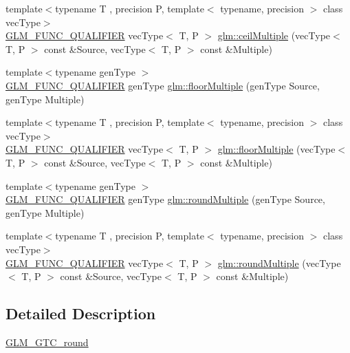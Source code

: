 \begin{DoxyCompactItemize}
\item 
{\footnotesize template$<$typename T , precision P, template$<$ typename, precision $>$ class vec\+Type$>$ }\\\mbox{\hyperlink{setup_8hpp_a33fdea6f91c5f834105f7415e2a64407}{G\+L\+M\+\_\+\+F\+U\+N\+C\+\_\+\+Q\+U\+A\+L\+I\+F\+I\+ER}} vec\+Type$<$ T, P $>$ \mbox{\hyperlink{group__gtc__round_gafe632af669ac57d670ca18e3665a12ca}{glm\+::ceil\+Multiple}} (vec\+Type$<$ T, P $>$ const \&Source, vec\+Type$<$ T, P $>$ const \&Multiple)
\item 
{\footnotesize template$<$typename gen\+Type $>$ }\\\mbox{\hyperlink{setup_8hpp_a33fdea6f91c5f834105f7415e2a64407}{G\+L\+M\+\_\+\+F\+U\+N\+C\+\_\+\+Q\+U\+A\+L\+I\+F\+I\+ER}} gen\+Type \mbox{\hyperlink{group__gtc__round_ga9eafb9dbedf84e5cece65c2fe9d5631d}{glm\+::floor\+Multiple}} (gen\+Type Source, gen\+Type Multiple)
\item 
{\footnotesize template$<$typename T , precision P, template$<$ typename, precision $>$ class vec\+Type$>$ }\\\mbox{\hyperlink{setup_8hpp_a33fdea6f91c5f834105f7415e2a64407}{G\+L\+M\+\_\+\+F\+U\+N\+C\+\_\+\+Q\+U\+A\+L\+I\+F\+I\+ER}} vec\+Type$<$ T, P $>$ \mbox{\hyperlink{group__gtc__round_ga6912db42d43873fe1dedb3aed2b7a239}{glm\+::floor\+Multiple}} (vec\+Type$<$ T, P $>$ const \&Source, vec\+Type$<$ T, P $>$ const \&Multiple)
\item 
{\footnotesize template$<$typename gen\+Type $>$ }\\\mbox{\hyperlink{setup_8hpp_a33fdea6f91c5f834105f7415e2a64407}{G\+L\+M\+\_\+\+F\+U\+N\+C\+\_\+\+Q\+U\+A\+L\+I\+F\+I\+ER}} gen\+Type \mbox{\hyperlink{group__gtc__round_ga6739d1de04b2cea7c78675b365644bce}{glm\+::round\+Multiple}} (gen\+Type Source, gen\+Type Multiple)
\item 
{\footnotesize template$<$typename T , precision P, template$<$ typename, precision $>$ class vec\+Type$>$ }\\\mbox{\hyperlink{setup_8hpp_a33fdea6f91c5f834105f7415e2a64407}{G\+L\+M\+\_\+\+F\+U\+N\+C\+\_\+\+Q\+U\+A\+L\+I\+F\+I\+ER}} vec\+Type$<$ T, P $>$ \mbox{\hyperlink{group__gtc__round_ga10a8ab7b254257b607b6a3fc68c3e661}{glm\+::round\+Multiple}} (vec\+Type$<$ T, P $>$ const \&Source, vec\+Type$<$ T, P $>$ const \&Multiple)
\end{DoxyCompactItemize}


\subsection{Detailed Description}
\mbox{\hyperlink{group__gtc__round}{G\+L\+M\+\_\+\+G\+T\+C\+\_\+round}} 